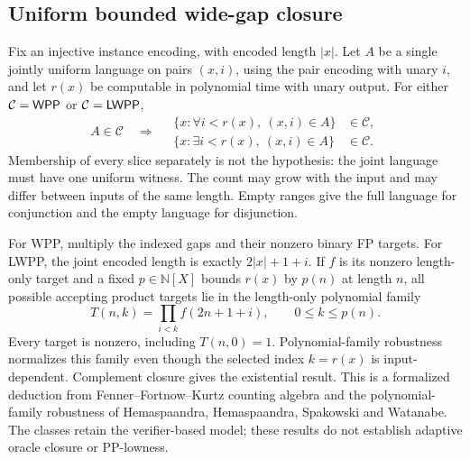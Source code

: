 \begin{result}
\subsection{Uniform bounded wide-gap closure}
Fix an injective instance encoding, with encoded length $|x|$. Let $A$ be a single
jointly uniform language on pairs $(x,i)$, using the pair encoding with unary $i$,
and let $r(x)$ be computable in polynomial time with unary output. For either
$\mathcal C=\mathsf{WPP}$ or $\mathcal C=\mathsf{LWPP}$,
\[
A\in\mathcal C\quad\Longrightarrow\quad
\begin{aligned}
\{x:\forall i<r(x),\ (x,i)\in A\}&\in\mathcal C,\\
\{x:\exists i<r(x),\ (x,i)\in A\}&\in\mathcal C.
\end{aligned}
\]
Membership of every slice separately is not the hypothesis: the joint language
must have one uniform witness. The count may grow with the input and may differ
between inputs of the same length. Empty ranges give the full language for
conjunction and the empty language for disjunction.

For WPP, multiply the indexed gaps and their nonzero binary FP targets.
For LWPP, the joint encoded length is exactly $2|x|+1+i$. If $f$ is its nonzero
length-only target and a fixed $p\in\mathbb N[X]$ bounds $r(x)$ by $p(n)$ at length $n$,
all possible accepting
product targets lie in the length-only polynomial family
\[
T(n,k)=\prod_{i<k}f(2n+1+i),\qquad 0\leq k\leq p(n).
\]
Every target is nonzero, including $T(n,0)=1$. Polynomial-family robustness
normalizes this family even though the selected index $k=r(x)$ is input-dependent.
Complement closure gives the existential result. This is a formalized deduction
from Fenner--Fortnow--Kurtz counting algebra and the polynomial-family robustness
of Hemaspaandra, Hemaspaandra, Spakowski and Watanabe.
\citep{FennerFortnowKurtz1994}\citep[Theorem 3.1]{HemaspaandraEtAl2018}
The classes retain the verifier-based model; these results do not establish
adaptive oracle closure or PP-lowness.
\end{result}

